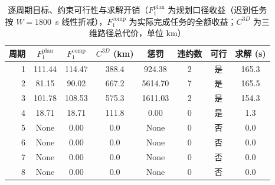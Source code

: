 \documentclass[a4paper,11pt]{article}
\begin{document}
\begin{table}[htbp]\centering
\caption{逐周期目标、约束可行性与求解开销（$F_1^{\mathrm{plan}}$ 为规划口径收益（迟到任务按 $W=1800$~s 线性折减），$F_1^{\mathrm{comp}}$ 为实际完成任务的全额收益；$C^{3D}$ 为三维路径总代价，单位 km）}
\label{tab:exp01-objective}
\begin{tabular}{rccccccc}
\toprule
周期 & $F_1^{\mathrm{plan}}$ & $F_1^{\mathrm{comp}}$ & $C^{3D}$ (km) & 惩罚 & 违约数 & 可行 & 求解 (s) \\
\midrule
1 & 111.44 & 114.47 & 388.4 & 924.38 & 2 & 是 & 165.3 \\
2 & 81.15 & 90.02 & 667.2 & 5614.70 & 7 & 是 & 165.5 \\
3 & 101.78 & 108.53 & 575.3 & 1611.03 & 2 & 是 & 154.3 \\
4 & 18.71 & 18.71 & 111.8 & 0.00 & 0 & 是 & 1.3 \\
5 & None & 0.00 & 0.0 & None & 0 & 否 & 0.0 \\
6 & None & 0.00 & 0.0 & None & 0 & 否 & 0.0 \\
7 & None & 0.00 & 0.0 & None & 0 & 否 & 0.0 \\
8 & None & 0.00 & 0.0 & None & 0 & 否 & 0.0 \\
\bottomrule
\end{tabular}
\end{table}
\end{document}
